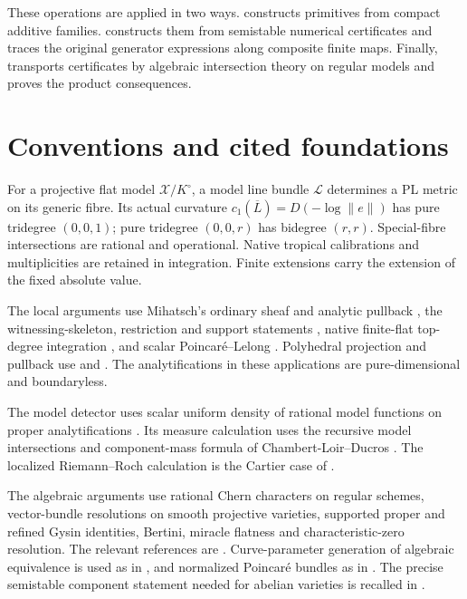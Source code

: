 \documentclass[11pt]{article}
\theoremstyle{definition}
\theoremstyle{remark}
\numberwithin{equation}{section}
\begin{document}
These operations are applied in two ways.  constructs primitives from compact additive families.  constructs them from semistable numerical certificates and traces the original generator expressions along composite finite maps. Finally,  transports certificates by algebraic intersection theory on regular models and proves the product consequences.

\section{Conventions and cited foundations}\label{sec:foundations}

For a projective flat model $\mathcal X/K^\circ$, a model line bundle $\mathcal L$ determines a PL metric on its generic fibre. Its actual curvature $c_1(\overline L)=D(-\log\|e\|)$ has pure tridegree $(0,0,1)$; pure tridegree $(0,0,r)$ has bidegree $(r,r)$. Special-fibre intersections are rational and operational. Native tropical calibrations and multiplicities are retained in integration. Finite extensions carry the extension of the fixed absolute value.

The local arguments use Mihatsch's ordinary sheaf and analytic pullback \cite[Definition 4.2 and Theorem 4.5]{M}, the witnessing-skeleton, restriction and support statements \cite[Lemma 4.4, Corollary 4.9 and Proposition 4.11]{M}, native finite-flat top-degree integration \cite[Lemma 3.15 and Definition 4.10]{M}, and scalar Poincar\'e--Lelong \cite[Theorem 5.5 and Corollary 5.6]{M}. Polyhedral projection and pullback use \cite[Section 2 and Proposition/Definition 4.2]{MTrop} and \cite[Proposition 2.38 and Definition 2.41]{M}. The analytifications in these applications are pure-dimensional and boundaryless.

The model detector uses scalar uniform density of rational model functions on proper analytifications \cite[Proposition 2.15]{GM}. Its measure calculation uses the recursive model intersections and component-mass formula of Chambert-Loir--Ducros \cite[Sections 8.7--8.8 and Theorem 18.5.5]{CLD}. The localized Riemann--Roch calculation is the Cartier case of \cite[Corollary 18.1.2]{Fulton}.

The algebraic arguments use rational Chern characters on regular schemes, vector-bundle resolutions on smooth projective varieties, supported proper and refined Gysin identities, Bertini, miracle flatness and characteristic-zero resolution. The relevant references are \cite{Stacks,StacksFEY,StacksFEW,StacksGysin}. Curve-parameter generation of algebraic equivalence is used as in \cite{ACMV}, and normalized Poincar\'e bundles as in \cite{MilneJV}. The precise semistable component statement needed for abelian varieties is recalled in .
\end{document}
